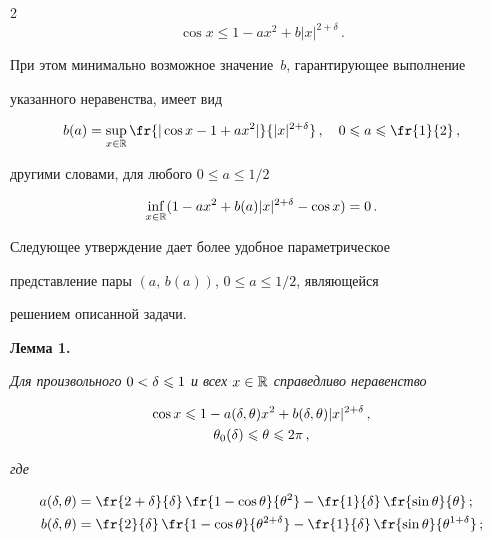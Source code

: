 \begin{multicols}{2}
$$

\cos x\le 1-ax^2+b|x|^{2+\delta}\,.

$$

При этом минимально возможное значение~$b$, гарантирующее выполнение

указанного неравенства, имеет вид

$$

b(a)=\sup_{x\in\R}\fr{|\cos x-1+ax^2|}{|x|^{2+\delta}}\,,\quad 0\le

a\le \fr{1}{2}\,,

$$

другими словами, для любого $0\le a\le1/2$

$$

\inf_{x\in\R}(1-ax^2+b(a)|x|^{2+\delta}-\cos x)=0\,.

$$

Следующее утверждение дает более удобное параметрическое

представление пары ${(a,\,b(a))}$, ${0\le a\le 1/2}$, являющейся

решением описанной задачи.



\medskip



\noindent

\textbf{Лемма 1.}

\textit{Для произвольного $0<\delta\leqslant1$ и всех $x\in\mathbb R$ справедливо неравенство}

\begin{multline}

\label{OcenkaCos}

\cos x\le1-a(\d,\theta)x^2+b(\d,\theta)|x|^{2+\d}\,, \\

\theta_0(\d)\le\theta\le 2\pi\,,

\end{multline}

\textit{где}

\begin{align}

    a(\d,\theta)&=\fr{2+\d}{\d}\,\fr{1-\cos \theta}{\theta^2}-

    \fr{1}{\delta}\,\fr{\sin \theta}{\theta}\,;\label{CosA}\\

    b(\d,\theta)&=\fr{2}{\delta}\,\fr{1-\cos \theta}{\theta^{2+\d}}-

    \fr{1}{\d}\,\fr{\sin\theta}{\theta^{1+\d}}\,;\label{CosB}

\end{align}


\end{multicols}
